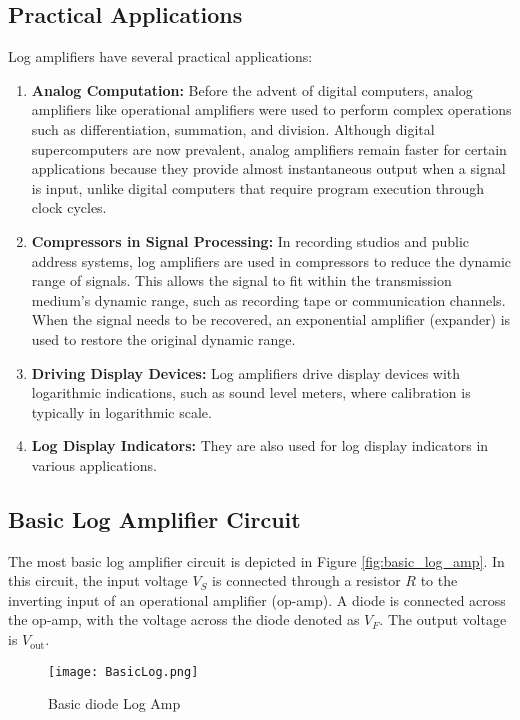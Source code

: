\documentclass[a4paper,9pt,twoside,openany,twocolumn]{memoir}
\begin{document}
\subsection{Practical Applications}
Log amplifiers have several practical applications:
\begin{enumerate}
    \item \textbf{Analog Computation:} Before the advent of digital computers, analog amplifiers like operational amplifiers were used to perform complex operations such as differentiation, summation, and division. Although digital supercomputers are now prevalent, analog amplifiers remain faster for certain applications because they provide almost instantaneous output when a signal is input, unlike digital computers that require program execution through clock cycles.
    
    \item \textbf{Compressors in Signal Processing:} In recording studios and public address systems, log amplifiers are used in compressors to reduce the dynamic range of signals. This allows the signal to fit within the transmission medium's dynamic range, such as recording tape or communication channels. When the signal needs to be recovered, an exponential amplifier (expander) is used to restore the original dynamic range.
    
    \item \textbf{Driving Display Devices:} Log amplifiers drive display devices with logarithmic indications, such as sound level meters, where calibration is typically in logarithmic scale.
    
    \item \textbf{Log Display Indicators:} They are also used for log display indicators in various applications.
\end{enumerate}

\subsection{Basic Log Amplifier Circuit}
The most basic log amplifier circuit is depicted in Figure \ref{fig:basic_log_amp}. In this circuit, the input voltage \(V_S\) is connected through a resistor \(R\) to the inverting input of an operational amplifier (op-amp). A diode is connected across the op-amp, with the voltage across the diode denoted as \(V_F\). The output voltage is \(V_{\text{out}}\).

\begin{figure}[H]
    \centering
    \texttt{[image: BasicLog.png]}
    \caption{Basic diode Log Amp}
    \label{fig:question_image}
\end{figure}
\end{document}
